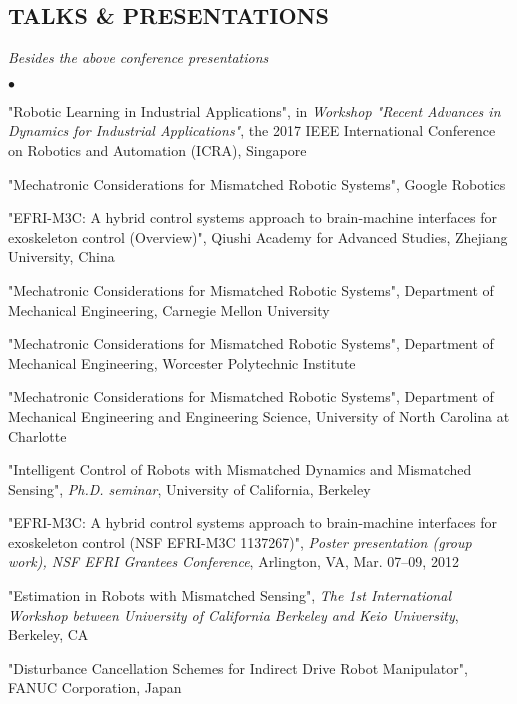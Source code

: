 \documentclass[UTF8,nofonts]{res}
\begin{document}
\begin{resume}
\section{TALKS \& PRESENTATIONS}
{\it Besides the above conference presentations}
\begin{list}{$\bullet$}{\setlength\leftmargin{0in}\setlength\topsep{0in}}
\item {} "Robotic Learning in Industrial Applications", in \emph{Workshop "Recent Advances in Dynamics for Industrial Applications"}, the 2017 IEEE International Conference on Robotics and Automation (ICRA), Singapore
\item {} "Mechatronic Considerations for Mismatched Robotic Systems", Google Robotics
\item {} "EFRI-M3C: A hybrid control systems approach to brain-machine interfaces for exoskeleton control (Overview)", Qiushi Academy for Advanced Studies, Zhejiang University, China
\item {} "Mechatronic Considerations for Mismatched Robotic Systems", Department of Mechanical Engineering, Carnegie Mellon University
\item {} "Mechatronic Considerations for Mismatched Robotic Systems", Department of Mechanical Engineering, Worcester Polytechnic Institute
\item {} "Mechatronic Considerations for Mismatched Robotic Systems", Department of Mechanical Engineering and Engineering Science, University of North Carolina at Charlotte
\item {} "Intelligent Control of Robots with Mismatched Dynamics and Mismatched Sensing", \emph{Ph.D. seminar}, University of California, Berkeley
\item {} "EFRI-M3C: A hybrid control systems approach to brain-machine interfaces for exoskeleton control (NSF EFRI-M3C 1137267)", \emph{Poster presentation (group work), NSF EFRI Grantees Conference}, Arlington, VA, Mar. 07--09, 2012
\item {} "Estimation in Robots with Mismatched Sensing", \emph{The 1st International Workshop between University of California Berkeley and Keio University}, Berkeley, CA
\item {} "Disturbance Cancellation Schemes for Indirect Drive Robot Manipulator", FANUC Corporation, Japan
\end{list}


\end{resume}
\end{document}

